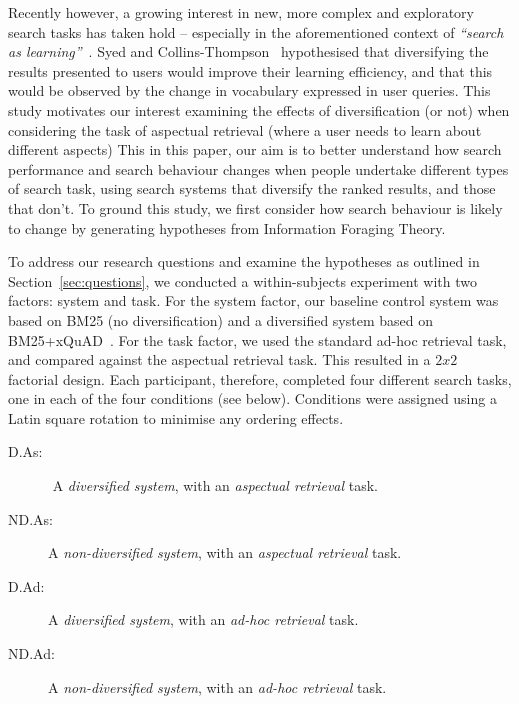 Recently however, a growing interest in new, more complex and exploratory search tasks has taken hold -- especially in the aforementioned context of \emph{``search as learning''}~\cite{collins2017sal}. Syed and Collins-Thompson~\cite{syed2017sal} hypothesised that diversifying the results presented to users would improve their learning efficiency, and that this would be observed by the change in vocabulary expressed in user queries. This study motivates our interest examining the effects of diversification (or not)  when considering the task of aspectual retrieval (where a user needs to learn about different aspects)  This in this paper, our aim is to better understand how search performance and search behaviour changes when people undertake different types of search task, using search systems that diversify the ranked results, and those that don't. To ground this study, we first consider how search behaviour is likely to change by generating hypotheses from Information Foraging Theory.

To address our research questions and examine the hypotheses as outlined in Section~\ref{sec:questions}, we conducted a within-subjects experiment with two factors: system and task. For the system factor, our baseline control system was based on BM25 (no diversification) and a diversified system based on BM25+xQuAD~\cite{santos2010query_reformulations_diversification}. For the task factor, we used the standard ad-hoc retrieval task, and compared against the aspectual retrieval task. This resulted in a $2x2$ factorial design. Each participant, therefore, completed four different search tasks, one in each of the four conditions (see below). Conditions were assigned using a Latin square rotation to minimise any ordering effects.


\begin{description}
\item[D.As: $ $ ] $ $ A \emph{diversified system}, with an \emph{aspectual retrieval} task.
\item[ND.As:] A \emph{non-diversified system}, with an \emph{aspectual retrieval} task.
\item[D.Ad: $ $ ] A \emph{diversified system}, with an \emph{ad-hoc retrieval} task. 
\item[ND.Ad:] A \emph{non-diversified system}, with an \emph{ad-hoc retrieval} task.
\end{description}


